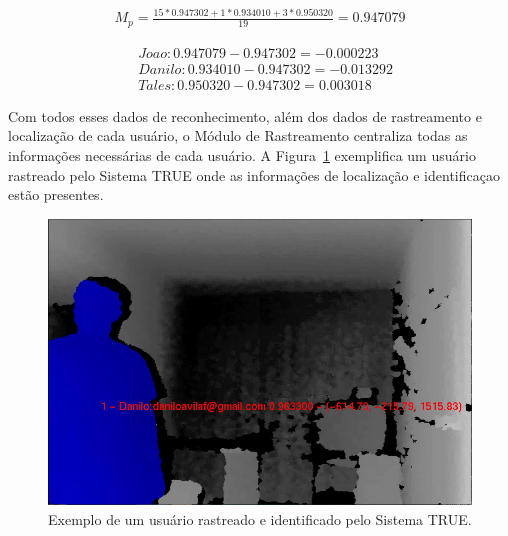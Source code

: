	\begin{align}
		\label{eq:joao}
		M_p = \frac{15 * 0.947302 + 1 * 0.934010 + 3 * 0.950320}{19} = 0.947079
	\end{align}

	\begin{align}
		\label{eq:joao2}
	 	& Joao: 0.947079 - 0.947302 = -0.000223\\
		\nonumber & Danilo: 0.934010 - 0.947302 = -0.013292\\
		\nonumber & Tales: 0.950320 - 0.947302 = 0.003018
	\end{align}

	Com todos esses dados de reconhecimento, além dos dados de rastreamento e localização de cada usuário, o Módulo de Rastreamento centraliza todas as informações necessárias de cada usuário. A Figura~\ref{fig:truetotal} exemplifica um usuário rastreado pelo Sistema TRUE onde as informações de localização e identificaçao estão presentes.

	\begin{figure}[htb]
			\begin{center}
				\includegraphics[scale=0.5]{figuras/4.ProblemaEProposta/user-reconhecido.png}
			\end{center}
			\caption{Exemplo de um usuário rastreado e identificado pelo Sistema TRUE.}
			\label{fig:truetotal}
		\end{figure}

